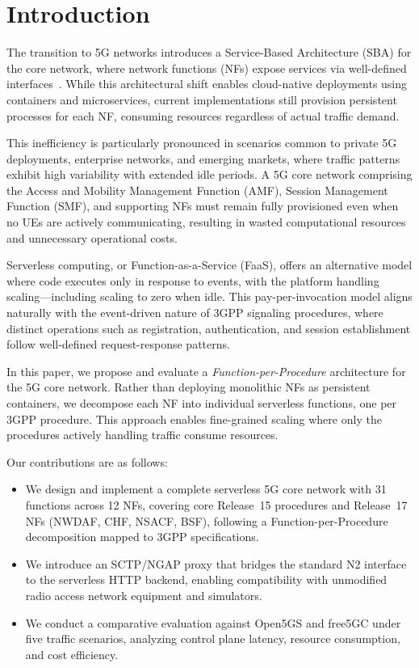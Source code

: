 \section{Introduction}

The transition to 5G networks introduces a Service-Based Architecture (SBA) for the core network, where network functions (NFs) expose services via well-defined interfaces~\cite{3gpp-23501}. While this architectural shift enables cloud-native deployments using containers and microservices, current implementations still provision persistent processes for each NF, consuming resources regardless of actual traffic demand.

This inefficiency is particularly pronounced in scenarios common to private 5G deployments, enterprise networks, and emerging markets, where traffic patterns exhibit high variability with extended idle periods. A 5G core network comprising the Access and Mobility Management Function (AMF), Session Management Function (SMF), and supporting NFs must remain fully provisioned even when no UEs are actively communicating, resulting in wasted computational resources and unnecessary operational costs.

Serverless computing, or Function-as-a-Service (FaaS), offers an alternative model where code executes only in response to events, with the platform handling scaling---including scaling to zero when idle. This pay-per-invocation model aligns naturally with the event-driven nature of 3GPP signaling procedures, where distinct operations such as registration, authentication, and session establishment follow well-defined request-response patterns.

In this paper, we propose and evaluate a \textit{Function-per-Procedure} architecture for the 5G core network. Rather than deploying monolithic NFs as persistent containers, we decompose each NF into individual serverless functions, one per 3GPP procedure. This approach enables fine-grained scaling where only the procedures actively handling traffic consume resources.

Our contributions are as follows:
\begin{itemize}
    \item We design and implement a complete serverless 5G core network with 31 functions across 12 NFs, covering core Release~15 procedures and Release~17 NFs (NWDAF, CHF, NSACF, BSF), following a Function-per-Procedure decomposition mapped to 3GPP specifications.
    \item We introduce an SCTP/NGAP proxy that bridges the standard N2 interface to the serverless HTTP backend, enabling compatibility with unmodified radio access network equipment and simulators.
    \item We conduct a comparative evaluation against Open5GS and free5GC under five traffic scenarios, analyzing control plane latency, resource consumption, and cost efficiency.
\end{itemize}

